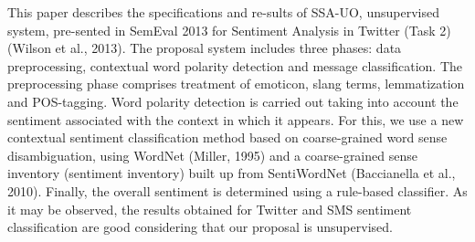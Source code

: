 This paper describes the specifications and re-sults of SSA-UO, unsupervised system, pre-sented in SemEval 2013 for Sentiment Analysis in Twitter (Task 2)
 (Wilson et al., 2013). The proposal system includes three phases: data
 preprocessing, contextual word polarity detection and message classification.
 The
 preprocessing phase comprises treatment of emoticon, slang terms, lemmatization
 and POS-tagging. Word polarity detection is carried out taking into account the
 sentiment associated with the context in which it appears. For this, we use a
 new contextual sentiment classification method based on coarse-grained
 word sense disambiguation, using WordNet (Miller, 1995) and a coarse-grained
 sense inventory (sentiment inventory) built up from SentiWordNet (Baccianella
 et al., 2010). Finally, the overall sentiment is determined using a rule-based
 classifier. As it may be observed, the results obtained for Twitter and
 SMS sentiment classification are good considering that our proposal is
 unsupervised.

